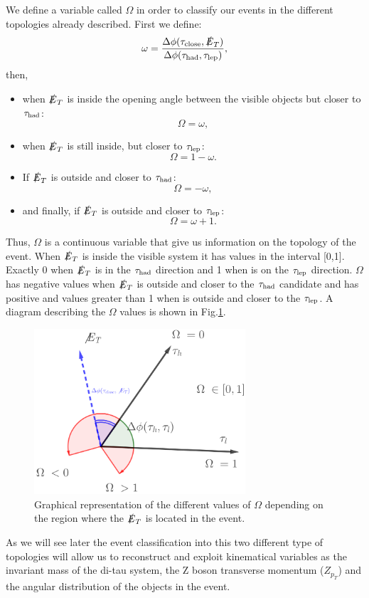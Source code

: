 We define a variable called $\Omega$ in order to classify our events in the different topologies already described. First we define:
\begin{equation}
	\omega=\frac{\Delta\phi(\tau_{\text{close}},\slashed{E}_T)}{\Delta\phi(\tau_\text{had},\tau_\text{lep})},
\end{equation}
then,
\begin{itemize}
	\item when $\slashed{E}_T$ is inside the opening angle between the visible objects but closer to $\tau_\text{had}$:
	\begin{equation}
		\Omega=\omega,
	\end{equation}
	\item when $\slashed{E}_T$ is still inside, but closer to $\tau_\text{lep}$:
	\begin{equation}
		\Omega=1-\omega.
	\end{equation}
	\item If $\slashed{E}_T$ is outside and closer to $\tau_\text{had}$:
	\begin{equation}
		\Omega=-\omega,
	\end{equation}
	\item and finally, if $\slashed{E}_T$ is outside and closer to $\tau_\text{lep}$:
	\begin{equation}
		\Omega=\omega+1.
	\end{equation}
\end{itemize}
Thus, $\Omega$ is a continuous variable that give us information on the topology of the event. When $\slashed{E}_T$ is inside the visible system it has values in the interval [0,1]. Exactly 0 when $\slashed{E}_T$ is in the $\tau_\text{had}$ direction and 1 when is on the $\tau_\text{lep}$ direction. $\Omega$ has negative values when $\slashed{E}_T$ is outside and closer to the $\tau_\text{had}$ candidate and has positive and values greater than 1 when is outside and closer to the $\tau_\text{lep}$. A diagram describing the $\Omega$ values is shown in Fig.\ref{Fig8}.
\begin{figure}[h]
	\centering
	\includegraphics[width=0.7\textwidth]{figures/Fig8}
	\caption{Graphical representation of the different values of $\Omega$ depending on the region where the $\slashed{E}_T$ is located in the event.}
	\label{Fig8}
\end{figure}
As we will see later the event classification into this two different type of topologies will allow us to reconstruct and exploit kinematical variables as the invariant mass of the di-tau system, the Z boson transverse momentum ($Z_{p_T}$) and the angular distribution of the objects in the event.

